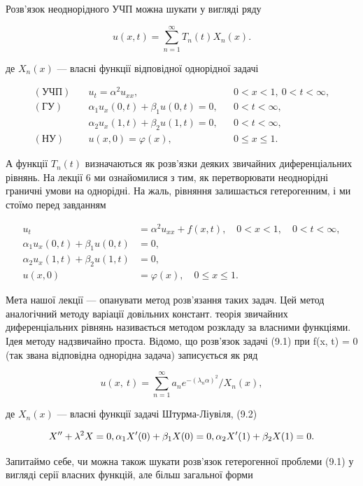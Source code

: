 \documentclass[
  ukrainian,
]{article}
\begin{document}
Розв'язок неоднорідного УЧП можна шукати у вигляді ряду

\[
u(x,t) = \sum_{n=1}^{\infty} T_n(t) X_n(x).
\]

де \(X_n(x)\) --- власні функції відповідної однорідної задачі

\[
\begin{aligned}
(\text{УЧП})\quad & u_t = \alpha^2 u_{xx}, && 0 < x < 1,\ 0 < t < \infty, \\
(\text{ГУ})\quad & \alpha_1 u_x(0,t) + \beta_1 u(0,t) = 0, && 0 < t < \infty, \\
& \alpha_2 u_x(1,t) + \beta_2 u(1,t) = 0, && 0 < t < \infty, \\
(\text{НУ})\quad & u(x,0) = \varphi(x), && 0 \leqslant x \leqslant 1.
\end{aligned}
\]

А функції \(T_n(t)\) визначаються як розв'язки деяких звичайних
диференціальних рівнянь. На лекції 6 ми ознайомилися з тим, як
перетворювати неоднорідні граничні умови на однорідні. На жаль, рівняння
залишається гетерогенним, і ми стоїмо перед завданням

\[
\begin{aligned}
u_{t} &= \alpha^{2} u_{xx} + f(x, t), \quad 0 < x < 1, \quad 0 < t < \infty,\\
\alpha_{1} u_{x}(0, t) + \beta_{1} u(0, t) &= 0, \\
\alpha_{2} u_{x}(1, t) + \beta_{2} u(1, t) &= 0, \\
u(x, 0) &= \varphi(x), \quad 0 \le x \le 1.
\end{aligned}
\]

Мета нашої лекції --- опанувати метод розв'язання таких задач. Цей метод
аналогічний методу варіації довільних констант. теорія звичайних
диференціальних рівнянь називається методом розкладу за власними
функціями. Ідея методу надзвичайно проста. Відомо, що розв'язок задачі
(9.1) при f(x, t) = 0 (так звана відповідна однорідна задача)
записується як ряд

\[
u\left(x,\ t\right)=\sum_{n=1}^{\infty}a_{n}e^{-\left(\lambda_{n}\alpha\right)^{2}}/X_{n}\left(x\right),
\]

де \(X_n(x)\) --- власні функції задачі Штурма-Ліувіля, (9.2)

\[
X'' + \lambda^2 X = 0, \\ \alpha_1 X'(0) + \beta_1 X(0) = 0, \\ \alpha_2 X'(1) + \beta_2 X(1) = 0.
\]

Запитаймо себе, чи можна також шукати розв'язок гетерогенної проблеми
(9.1) у вигляді серії власних функцій, але більш загальної форми
\end{document}
